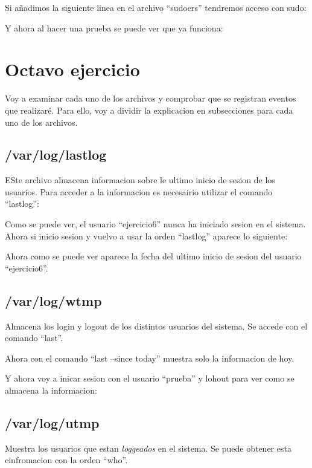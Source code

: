 \documentclass{article}
\begin{document}

Si añadimos la siguiente linea en el archivo ``sudoers'' tendremos acceso con sudo:



Y ahora al hacer una prueba se puede ver que ya funciona:


\section{Octavo ejercicio}
Voy a examinar cada uno de los archivos y comprobar que se registran eventos que realizaré. Para ello, voy a dividir la explicacion en subsecciones para cada uno de los archivos.

\subsection{/var/log/lastlog}
ESte archivo almacena informacion sobre le ultimo inicio de sesion de los usuarios. Para acceder a la informacion es necesairio utilizar el comando ``lastlog'':


Como se puede ver, el usuario ``ejercicio6'' nunca ha iniciado sesion en el sistema. Ahora si inicio sesion y vuelvo a usar la orden ``lastlog'' aparece lo siguiente:


Ahora como se puede ver aparece la fecha del ultimo inicio de sesion del usuario ``ejercicio6''.

\subsection{/var/log/wtmp}
Almacena los login y logout de los distintos usuarios del sistema. Se accede con el comando ``last''. 


Ahora con el comando ``last --since today'' muestra solo la informacion de hoy.


Y ahora voy a inicar sesion con el usuario ``prueba'' y lohout para ver como se almacena la informacion:

\subsection{/var/log/utmp}
Muestra los usuarios que estan \textit{loggeados} en el sistema. Se puede obtener esta cinfromacion con la orden ``who''.
\end{document}
